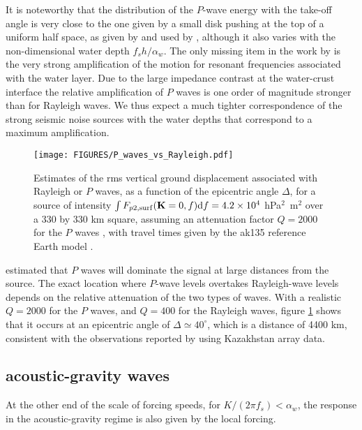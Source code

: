 It is noteworthy that the distribution of the $P$-wave energy with the take-off angle is very  close to the 
one given by a small disk pushing at the top of a uniform half space, as given by \cite{Miller&Pursey1955} and used by 
\cite{Vinnik1973}, although it also varies with the non-dimensional water depth $f_s h/\alpha_w$. 
The only missing item in the work by \cite{Vinnik1973} is the very strong amplification of the motion 
for resonant frequencies associated with the water layer. Due to the large impedance contrast at the water-crust interface 
the relative amplification of $P$ waves is one order of magnitude stronger 
than for Rayleigh waves. We thus expect a much tighter correspondence of the strong seismic noise sources with 
the water depths that correspond to a maximum amplification. 


\begin{figure}
\centerline{\texttt{[image: FIGURES/P\_waves\_vs\_Rayleigh.pdf]}}
  \caption{Estimates of the rms vertical ground displacement associated with Rayleigh or $P$ waves, 
as a function of the epicentric angle $\Delta$, for a source of intensity 
$\int F_{p2,\mathrm{surf}}(\mathbf{K} = 0,f) \mathrm{d}f = 4.2\times 10^4$ 
hPa$^2$~m$^2$ over a 330 by 330 km square, 
assuming an attenuation factor $Q=2000$ for the $P$ waves \citep{Pasyanos&al.2009}, with travel times 
given by the ak135 reference Earth model \citep{Snoke2009}. }
\label{fig:P_vs_Rayleigh}
\end{figure}
\cite{Ardhuin&Herbers2013} estimated that $P$ waves will dominate the signal at large distances from the source. 
The exact location where $P$-wave levels overtakes Rayleigh-wave levels depends 
on the relative attenuation of the two types of waves. With a realistic $Q=2000$ for the $P$ waves, and 
$Q=400$ for the Rayleigh waves, figure \ref{fig:P_vs_Rayleigh} shows that it occurs at an epicentric angle of $\Delta \simeq 40^{\circ}$, which is a distance of 4400 km, 
consistent with the observations reported by \cite{Vinnik1973} using Kazakhstan array data.  

\subsection{acoustic-gravity waves}
At the other end of the scale of forcing speeds, for $K/(2\pi f_s)< \alpha_w$, the response in the acoustic-gravity regime is also given by the local forcing. 

